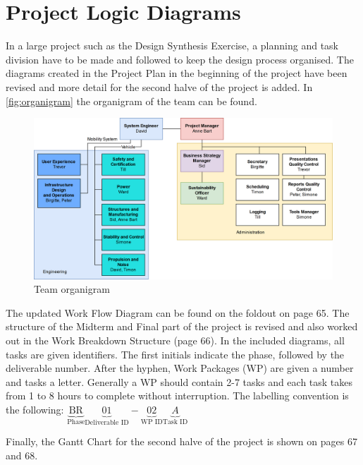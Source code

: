 \newpage
\chapter{Project Logic Diagrams}
\label{ch-diagrams}

In a large project such as the Design Synthesis Exercise, a planning and task division have to be made and followed to keep the design process organised. The diagrams created in the Project Plan in the beginning of the project have been revised and more detail for the second halve of the project is added. In \autoref{fig:organigram} the organigram of the team can be found. 



\begin{figure}[h]
    \centering
    \includegraphics[width=0.9\linewidth]{Figures/organigram.png}
    \captionsetup{justification=centering}
    \caption{Team organigram}
    \label{fig:organigram}
\end{figure}



The updated Work Flow Diagram can be found on the foldout on page 65. The structure of the Midterm and Final part of the project is revised and also worked out in the Work Breakdown Structure (page 66). In the included diagrams, all tasks are given identifiers. The first initials indicate the phase, followed by the deliverable number. After the hyphen, Work Packages (WP) are given a number and tasks a letter. Generally a WP should contain 2-7 tasks and each task takes from 1 to 8 hours to complete without interruption. The labelling convention is the following: $\underbrace{\text{BR}}_\text{Phase}\underbrace{01}_\text{Deliverable ID}-\underbrace{02}_\text{WP ID}\underbrace{A}_\text{Task ID}$ 

Finally, the Gantt Chart for the second halve of the project is shown on pages 67 and 68.

%  

%


%

%


